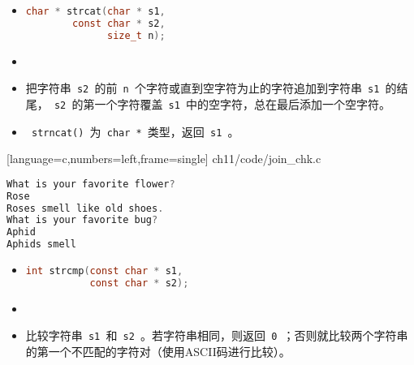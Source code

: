 \begin{frame}[fragile]
  \begin{itemize}
  \item {}
    \begin{lstlisting}[language=c,backgroundcolor=\color{red!20}]
char * strcat(char * s1, 
        const char * s2, 
              size_t n);
    \end{lstlisting}
  \item 
  \item[]
    把字符串\lstinline| s2 |的前\lstinline| n |个字符或直到空字符为止的字符追加到字符串\lstinline| s1 |的结尾，\lstinline| s2 |的第一个字符覆盖\lstinline| s1 |中的空字符，总在最后添加一个空字符。\\[0.1in]
  \item
    \lstinline| strncat() |为\lstinline| char * |类型，返回\lstinline| s1 |。
  \end{itemize}
\end{frame}

\begin{frame}
  
  [language=c,numbers=left,frame=single]
  {ch11/code/join_chk.c}
\end{frame}


\begin{frame}[fragile]
\begin{lstlisting}[language=c]
What is your favorite flower?
Rose
Roses smell like old shoes.
What is your favorite bug?
Aphid
Aphids smell
\end{lstlisting}

\end{frame}

\begin{frame}[fragile] 
  \begin{itemize}
  \item {}
    \begin{lstlisting}[language=c,backgroundcolor=\color{red!20}]
int strcmp(const char * s1, 
           const char * s2);
    \end{lstlisting}
  \item
  \item[]
    比较字符串\lstinline| s1 |和\lstinline| s2 |。若字符串相同，则返回\lstinline| 0 |；否则就比较两个字符串的第一个不匹配的字符对（使用ASCII码进行比较）。
  \end{itemize}
\end{frame}

